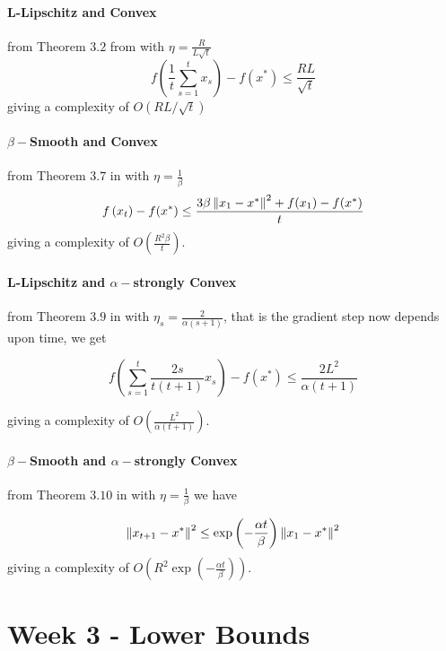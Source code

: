 \paragraph{L-Lipschitz and Convex} from Theorem $3.2$ from \cite{bubeck} with $\eta = \frac{R}{L \sqrt{t}}$
\begin{equation}
f\left( \frac{1}{t} \sum_{s=1}^t x_s\right) - f(x^{*}) \leq \frac{RL}{\sqrt{t}}
\end{equation}
giving a complexity of $O(RL/\sqrt{t})$

\paragraph{$\beta-$Smooth and Convex} from Theorem $3.7$ in \cite{bubeck} with $\eta=
\frac{1}{\beta}$
\begin{equation}
    f\left( x_t \right) - f(x^{*}) \leq \frac{3 \beta \left\lVert x_1 - x^*\right\rVert^2 + f(x_1) - f(x^*)}{t}
\end{equation}
giving a complexity of $O\left(\frac{R^2 \beta}{t}\right)$.

\paragraph{L-Lipschitz and $\alpha-$strongly Convex} from Theorem $3.9$ in \cite{bubeck} with $\eta_s = \frac{2}{\alpha(s+1)}$, that is the gradient step now depends upon time, we get


\begin{equation}
f\left( \sum_{s=1}^t \frac{2s}{t(t+1)} x_s\right) - f(x^{*}) \leq \frac{2L^2}{\alpha (t+1)}
\end{equation}

giving a complexity of $O\left(\frac{L^2}{\alpha (t+1)}\right)$.

\paragraph{$\beta-$Smooth and $\alpha-$strongly Convex} from Theorem $3.10$ in \cite{bubeck} with $\eta = \frac{1}{\beta}$ we have

\begin{equation}
    \left\lVert x_{t+1} - x^*\right\rVert^2 \leq \exp\left( - \frac{\alpha t}{\beta}\right) \left\lVert x_1 - x^*\right\rVert^2
\end{equation}
giving a complexity of $O\left( R^2 \exp\left( - \frac{\alpha t}{\beta}\right) \right)$.

\section{Week 3 - Lower Bounds}

